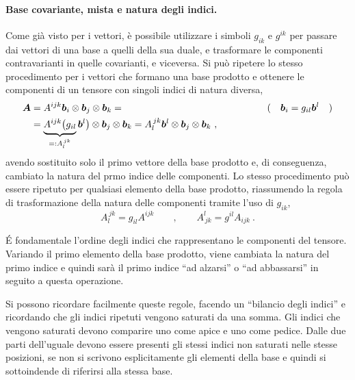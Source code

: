 \paragraph{Base covariante, mista e natura degli indici.}
Come già visto per i vettori, è possibile utilizzare i simboli $g_{ik}$ e $g^{ik}$ per passare dai vettori di una base a quelli della sua duale, e trasformare le componenti contravarianti in quelle covarianti, e viceversa. Si può ripetere lo stesso procedimento per i vettori che formano una base prodotto e ottenere le componenti di un tensore con singoli indici di natura diversa,
\begin{equation}
\begin{aligned}
 \bm{A} & = A^{ijk} \bm{b}_i \otimes \bm{b}_j \otimes \bm{b}_k = & \hspace{1.5cm} ( \quad \bm{b}_i = g_{il} \bm{b}^l \quad ) \\
        & = \underbrace{A^{ijk} \big(g_{il} }_{=: A_l^{\, jk}} \bm{b}^l \big) \otimes \bm{b}_j \otimes \bm{b}_k = A_l^{\, jk} \bm{b}^l \otimes \bm{b}_j \otimes \bm{b}_k \ ,
\end{aligned}
\end{equation}
avendo sostituito solo il primo vettore della base prodotto e, di conseguenza, cambiato la natura del prmo indice delle componenti. Lo stesso procedimento può essere ripetuto per qualsiasi elemento della base prodotto, riassumendo la regola di trasformazione della natura delle componenti tramite l'uso di $g_{ik}$,
\begin{equation}
 A_{l}^{\, jk} = g_{il} A^{ijk} \qquad , \qquad  A^{l}_{\, jk} = g^{il} A_{ijk} \ .
\end{equation}
\begin{remark}
  \'E fondamentale l'ordine degli indici che rappresentano le componenti del tensore. Variando il primo elemento della base prodotto, viene cambiata la natura del primo indice e quindi sarà il primo indice ``ad alzarsi'' o ``ad abbassarsi'' in seguito a questa operazione.
\end{remark}
\begin{remark}
 Si possono ricordare facilmente queste regole, facendo un ``bilancio degli indici'' e ricordando che gli indici ripetuti vengono saturati da una somma. Gli indici che vengono saturati devono comparire uno come apice e uno come pedice. Dalle due parti dell'uguale devono essere presenti gli stessi indici non saturati nelle stesse posizioni, se non si scrivono esplicitamente gli elementi della base e quindi si sottoindende di riferirsi alla stessa base.
\end{remark}


